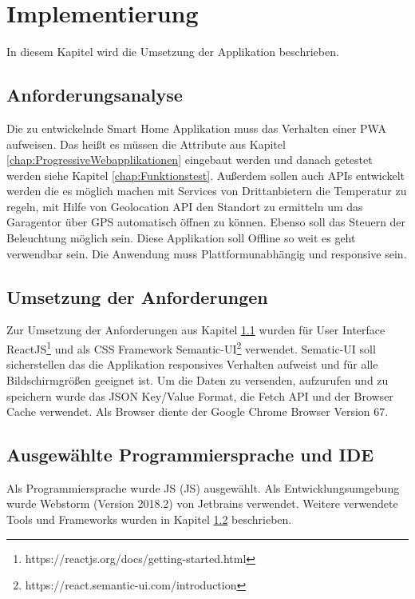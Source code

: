 \chapter{Implementierung}\label{chap:Implementierung}
\thispagestyle{standard}
\pagestyle{standard}

In diesem Kapitel wird die Umsetzung der Applikation beschrieben.

\section{Anforderungsanalyse}\label{sub:Anforderungsanalyse}
Die zu entwickelnde Smart Home Applikation muss das Verhalten einer \acs{PWA} aufweisen. Das heißt es müssen die Attribute aus Kapitel \ref{chap:ProgressiveWebapplikationen} eingebaut werden und danach getestet werden siehe Kapitel \ref{chap:Funktionstest}. Außerdem sollen auch APIs entwickelt werden die es möglich machen mit Services von Drittanbietern die Temperatur zu regeln, mit Hilfe von Geolocation API den Standort zu ermitteln um das Garagentor über GPS automatisch öffnen zu können. Ebenso soll das Steuern der Beleuchtung möglich sein. Diese Applikation soll Offline so weit es geht verwendbar sein. Die Anwendung muss Plattformunabhängig und responsive sein.

\section{Umsetzung der Anforderungen}\label{sub:Umsetzung der Anforderungen}
Zur Umsetzung der Anforderungen aus Kapitel \ref{sub:Anforderungsanalyse} wurden für User Interface ReactJS\footnote{https://reactjs.org/docs/getting-started.html} und als CSS Framework Semantic-UI\footnote{https://react.semantic-ui.com/introduction} verwendet. Sematic-UI soll sicherstellen das die Applikation responsives Verhalten aufweist und für alle Bildschirmgrößen geeignet ist. Um die Daten zu versenden, aufzurufen und zu speichern wurde das JSON Key/Value Format, die Fetch API und der Browser Cache verwendet.
Als Browser diente der Google Chrome Browser Version 67.

\section{Ausgewählte Programmiersprache und IDE}
Als Programmiersprache wurde \acl{JS} (\acs{JS}) ausgewählt. 
Als Entwicklungsumgebung wurde Webstorm (Version 2018.2) von Jetbrains verwendet. 
Weitere verwendete Tools und Frameworks wurden in Kapitel \ref{sub:Umsetzung der Anforderungen} beschrieben.
\newpage
